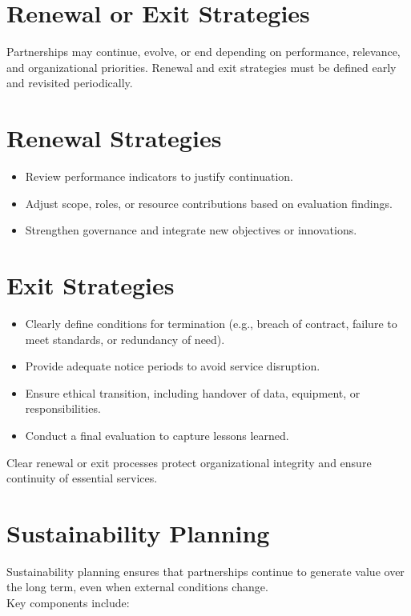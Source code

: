 \documentclass[10pt]{article}
\begin{document}
\section*{Renewal or Exit Strategies}
Partnerships may continue, evolve, or end depending on performance, relevance, and organizational priorities. Renewal and exit strategies must be defined early and revisited periodically.

\section*{Renewal Strategies}
\begin{itemize}
  \item Review performance indicators to justify continuation.
  \item Adjust scope, roles, or resource contributions based on evaluation findings.
  \item Strengthen governance and integrate new objectives or innovations.
\end{itemize}

\section*{Exit Strategies}
\begin{itemize}
  \item Clearly define conditions for termination (e.g., breach of contract, failure to meet standards, or redundancy of need).
  \item Provide adequate notice periods to avoid service disruption.
  \item Ensure ethical transition, including handover of data, equipment, or responsibilities.
  \item Conduct a final evaluation to capture lessons learned.
\end{itemize}

Clear renewal or exit processes protect organizational integrity and ensure continuity of essential services.

\section*{Sustainability Planning}
Sustainability planning ensures that partnerships continue to generate value over the long term, even when external conditions change.\\
Key components include:
\end{document}
